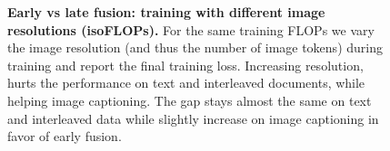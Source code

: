 \begin{figure}[t!]
    \centering
    \captionsetup{type=figure}
    \begin{subfigure}[t]{0.48\linewidth}
        
    \end{subfigure}
    \begin{subfigure}[t]{0.48\linewidth}
        
    \end{subfigure}
    \vspace{-7pt}
    \caption{\textbf{Early vs late fusion: training with different image
    resolutions (isoFLOPs).} For the same training FLOPs we vary the image
    resolution (and thus the number of image tokens) during training and report
    the final training loss. Increasing resolution, hurts the performance on
    text and interleaved documents, while helping image captioning. The gap
    stays almost the same on text and interleaved data while slightly increase
    on image captioning in favor of early fusion.}
    \label{fig:early_vs_late_imageres}
\end{figure}
